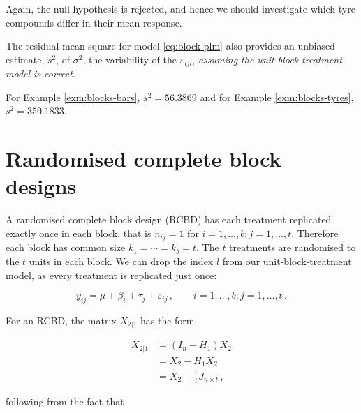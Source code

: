 \documentclass[
]{book}
\newenvironment{Shaded}{\begin{snugshade}}{\end{snugshade}}
\newcommand{\DecValTok}[1]{\textcolor[rgb]{0.00,0.00,0.81}{#1}}
\newcommand{\FunctionTok}[1]{\textcolor[rgb]{0.00,0.00,0.00}{#1}}
\newcommand{\NormalTok}[1]{#1}
\newcommand{\OtherTok}[1]{\textcolor[rgb]{0.56,0.35,0.01}{#1}}
\newcommand{\SpecialCharTok}[1]{\textcolor[rgb]{0.00,0.00,0.00}{#1}}
\theoremstyle{definition}
\theoremstyle{definition}
\theoremstyle{definition}
\theoremstyle{definition}
\theoremstyle{remark}
\begin{document}
Again, the null hypothesis is rejected, and hence we should investigate which tyre compounds differ in their mean response.

The residual mean square for model \eqref{eq:block-plm} also provides an unbiased estimate, \(s^2\), of \(\sigma^2\), the variability of the \(\varepsilon_{ijl}\), \emph{assuming the unit-block-treatment model is correct}.

\begin{Shaded}
\end{Shaded}

For Example \ref{exm:blocks-bars},
\(s^2 = 56.3869\) and for Example \ref{exm:blocks-tyres}, \(s^2 = 350.1833\).

\hypertarget{rcdb}{%
\section{Randomised complete block designs}\label{rcdb}}

A randomised complete block design (RCBD) has each treatment replicated exactly once in each block, that is \(n_{ij} = 1\) for \(i=1,\ldots, b; j = 1, \ldots, t\). Therefore each block has common size \(k_1=\cdots =k_b = t\). The \(t\) treatments are randomised to the \(t\) units in each block. We can drop the index \(l\) from our unit-block-treatment model, as every treatment is replicated just once:

\begin{equation*}
y_{ij} = \mu + \beta_i + \tau_j + \varepsilon_{ij}\,, \qquad i = 1,\ldots, b; j = 1, \ldots, t\,.
\end{equation*}

For an RCBD, the matrix \(X_{2|1}\) has the form

\begin{align}
X_{2|1} & = (I_n - H_1)X_2 \nonumber \\
& = X_2 - H_1X_2 \nonumber \\
& = X_2 - \frac{1}{t}J_{n \times t} \label{eq:rcbd-x21}\,,
\end{align}

following from the fact that
\end{document}
